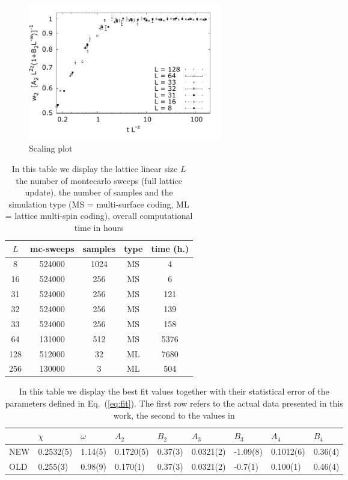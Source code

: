 \documentclass[prl,showpacs,amssymb,floatfix]{revtex4-1}
\begin{document}
\begin{figure}[t]
\begin{center}
\includegraphics[width=8.5cm]{scalingplot}
\end{center}
\caption{Scaling plot}
\end{figure}




\begin{table}[htb]
\begin{tabular}{|*{5}{c|}}
\hline
 $L$ & mc-sweeps  & samples & type & time (h.)\\
\hline
\hline
8 & 524000 & 1024 & MS & 4 \\
\hline
16 & 524000 & 256 & MS & 6 \\
\hline
31 & 524000 &  256 & MS &121 \\
\hline
32 & 524000 & 256 & MS & 139 \\
\hline
33 & 524000 & 256 & MS & 158 \\
\hline
64 & 131000 & 512 & MS  & 5376 \\
\hline
128 & 512000 & 32 & ML & 7680 \\
\hline
256 & 130000 & 3 & ML & 504 \\
\hline
\end{tabular}
\protect\caption{In this table we display the lattice linear size $L$
  the number of montecarlo sweeps (full lattice update), the number of
  samples and the simulation type (MS = multi-surface coding, ML =
  lattice multi-spin coding), overall computational time in hours}
\label{tab:simulpara}
\end{table}

\begin{table}[htb]
\begin{tabular}{|*{9}{l|}}
\hline
  & $\chi$ & $\omega$ & $A_2$ & $B_2$  & $A_3$ &  $B_3$ & $A_4$ & $B_4$ \\
\hline
\hline
NEW & 0.2532(5)  & 1.14(5) & 0.1720(5)& 0.37(3)& 0.0321(2)& -1.09(8) & 0.1012(6)&  0.36(4) 
\\
\hline
OLD &  0.255(3) &0.98(9) & 0.170(1)& 0.37(3) & 0.0321(2) & -0.7(1) & 0.100(1) & 0.46(4) 
\\
\hline
\end{tabular}
\protect\caption{In this table we display the best fit values together
with their statistical error of the parameters defined in
Eq.~(\ref{eq:fit}). The first row refers to the actual data presented
in this work, the second to the values in \cite{NOIKPZ2001}}
\label{tab:fitpara}
\end{table}








%

\end{document}
